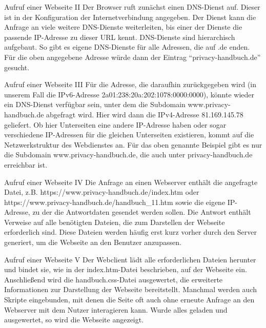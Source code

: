 \documentclass[utf8]{beamer}
\begin{document}
	\begin{frame}{Aufruf einer Webseite II}
		Der Browser ruft zunächst einen DNS-Dienst auf. Dieser ist in der Konfiguration der Internetverbindung angegeben. Der Dienst kann die Anfrage an viele weitere DNS-Dienste weiterleiten, bis einer der Dienste die passende IP-Adresse zu dieser URL kennt.
		DNS-Dienste sind hierarchisch aufgebaut. So gibt es eigene DNS-Dienste für alle Adressen, die auf .de enden. Für die oben angegebene Adresse würde dann der Eintrag \enquote{privacy-handbuch.de} gesucht.
	\end{frame}

	\begin{frame}{Aufruf einer Webseite III}
		Für die Adresse, die daraufhin zurückgegeben wird  (in unserem Fall die IPv6-Adresse 2a01:238:20a:202:1078:0000:0000), könnte wieder ein DNS-Dienst verfügbar sein, unter dem die Subdomain www.privacy-handbuch.de abgefragt wird. Hier wird dann die IPv4-Adresse 81.169.145.78 geliefert. Ob hier Unterseiten eine andere IP-Adresse haben oder sogar verschiedene IP-Adressen für die gleichen Unterseiten existieren, kommt auf die Netzwerkstruktur des Webdienstes an. Für das oben genannte Beispiel gibt es nur die Subdomain www.privacy-handbuch.de, die auch unter privacy-handbuch.de erreichbar ist.
	\end{frame}

	\begin{frame}{Aufruf einer Webseite IV}
		Die Anfrage an einen Webserver enthält die angefragte Datei, z.B. https://www.privacy-handbuch.de/index.htm oder https://www.privacy-handbuch.de/handbuch\_11.htm sowie die eigene IP-Adresse, zu der die Antwortdaten gesendet werden sollen.
		Die Antwort enthält Verweise auf alle benötigten Dateien, die zum Darstellen der Webseite erforderlich sind. Diese Dateien werden häufig erst kurz vorher durch den Server generiert, um die Webseite an den Benutzer anzupassen.
	\end{frame}

	\begin{frame}{Aufruf einer Webseite V}
		Der Webclient lädt alle erforderlichen Dateien herunter und bindet sie, wie in der     index.htm-Datei beschrieben, auf der Webseite ein. Anschließend wird die handbuch.css-Datei ausgewertet, die erweiterte Informationen zur Darstellung der Webseite bereitstellt. Manchmal werden auch Skripte eingebunden, mit denen die Seite oft auch ohne erneute Anfrage an den Webserver mit dem Nutzer interagieren kann. Wurde alles geladen und ausgewertet, so wird die Webseite angezeigt.
	\end{frame}
	
\end{document}
